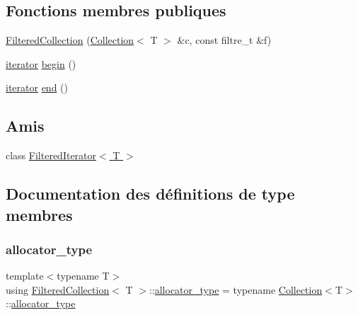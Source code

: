 \subsection*{Fonctions membres publiques}
\begin{DoxyCompactItemize}
\item 
\hyperlink{class_filtered_collection_a78c712f40560a66d05ce97755d6c0749}{Filtered\+Collection} (\hyperlink{class_collection}{Collection}$<$ T $>$ \&c, const filtre\+\_\+t \&f)
\item 
\hyperlink{class_collection_a317dca4fdf1eb2e47643bb60c620f802}{iterator} \hyperlink{class_filtered_collection_a114f2b1557201e523a264d549926ab0a}{begin} ()
\item 
\hyperlink{class_collection_a317dca4fdf1eb2e47643bb60c620f802}{iterator} \hyperlink{class_filtered_collection_ae310c937df5035ef07f7d4de65fca18b}{end} ()
\end{DoxyCompactItemize}
\subsection*{Amis}
\begin{DoxyCompactItemize}
\item 
class \hyperlink{class_filtered_collection_ac3e52cfdc762d90ccbb2121ff410fc5e}{Filtered\+Iterator$<$ T $>$}
\end{DoxyCompactItemize}


\subsection{Documentation des définitions de type membres}
\mbox{\label{class_filtered_collection_a89348fde51fe48c6528e5ac5abe72c6d}} 
\subsubsection{\texorpdfstring{allocator\+\_\+type}{allocator\_type}}
{\footnotesize\ttfamily template$<$typename T$>$ \\
using \hyperlink{class_filtered_collection}{Filtered\+Collection}$<$ T $>$\+::\hyperlink{class_collection_ac7974b0b552f0a94065aadc48ae53397}{allocator\+\_\+type} =  typename \hyperlink{class_collection}{Collection}$<$T$>$\+::\hyperlink{class_collection_ac7974b0b552f0a94065aadc48ae53397}{allocator\+\_\+type}}

